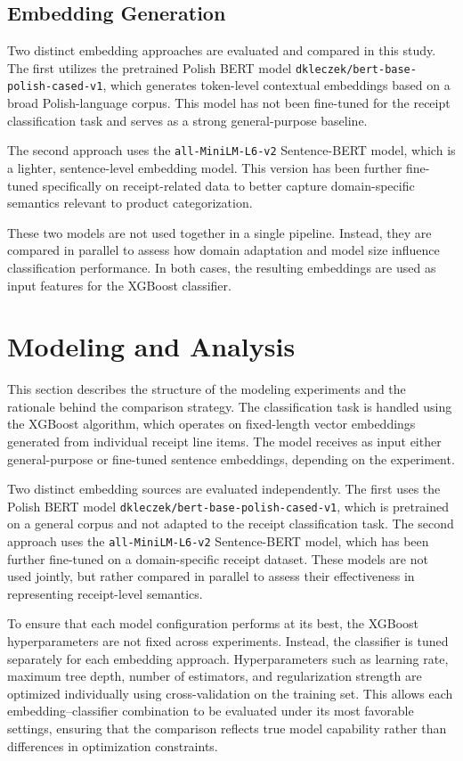 \documentclass{SGGW-thesis-EN}
\begin{document}
\newpage
\subsection{Embedding Generation}
Two distinct embedding approaches are evaluated and compared in this study. The first utilizes the pretrained Polish BERT model  
\texttt{dkleczek/bert-base-polish-cased-v1}, which generates token-level contextual embeddings based on a broad Polish-language corpus.  
This model has not been fine-tuned for the receipt classification task and serves as a strong general-purpose baseline.

The second approach uses the \texttt{all-MiniLM-L6-v2} Sentence-BERT model, which is a lighter, sentence-level embedding model. This version has  
been further fine-tuned specifically on receipt-related data to better capture domain-specific semantics relevant to product categorization.

These two models are not used together in a single pipeline. Instead, they are compared in parallel to assess how domain adaptation and model  
size influence classification performance. In both cases, the resulting embeddings are used as input features for the XGBoost classifier.



\section{Modeling and Analysis}

This section describes the structure of the modeling experiments and the rationale behind the comparison strategy. The classification task is  
handled using the XGBoost algorithm, which operates on fixed-length vector embeddings generated from individual receipt line items. The model  
receives as input either general-purpose or fine-tuned sentence embeddings, depending on the experiment.

Two distinct embedding sources are evaluated independently. The first uses the Polish BERT model \texttt{dkleczek/bert-base-polish-cased-v1},  
which is pretrained on a general corpus and not adapted to the receipt classification task. The second approach uses the  
\texttt{all-MiniLM-L6-v2} Sentence-BERT model, which has been further fine-tuned on a domain-specific receipt dataset. These models are not  
used jointly, but rather compared in parallel to assess their effectiveness in representing receipt-level semantics.

To ensure that each model configuration performs at its best, the XGBoost hyperparameters are not fixed across experiments. Instead, the  
classifier is tuned separately for each embedding approach. Hyperparameters such as learning rate, maximum tree depth, number of estimators,  
and regularization strength are optimized individually using cross-validation on the training set. This allows each embedding–classifier  
combination to be evaluated under its most favorable settings, ensuring that the comparison reflects true model capability rather than  
differences in optimization constraints.
\end{document}
